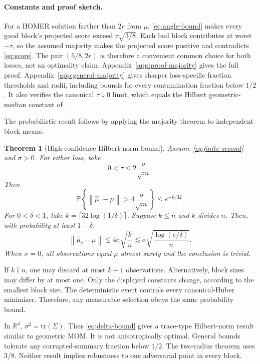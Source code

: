 \documentclass[twoside]{article}
\newtheorem{theorem}{Theorem}
\theoremstyle{definition}
\newcommand{\Pp}{\mathbb P}
\newcommand{\R}{\mathbb R}
\newcommand{\norm}[1]{\left\lVert #1\right\rVert}
\newcommand{\tr}{\mathrm{tr}}
\begin{document}
\paragraph{Constants and proof sketch.}
For a HOMER solution farther than $2r$ from $\mu$, \eqref{eq:angle-bound} makes every good block's projected score exceed $\tau\sqrt{3/8}$. Each bad block contributes at worst $-\tau$, so the assumed majority makes the projected score positive and contradicts \eqref{eq:score}. The pair $(5/8,2r)$ is therefore a convenient common choice for both losses, not an optimality claim. Appendix~\ref{app:proof-majority} gives the full proof. Appendix~\ref{app:general-majority} gives sharper loss-specific fraction thresholds and radii, including bounds for every contamination fraction below $1/2$. It also verifies the canonical $\tau\downarrow0$ limit, which equals the Hilbert geometric-median constant of \citet[Lemma~2.1]{minsker_2015_GeometricMedianRobust}.



The probabilistic result follows by applying the majority theorem to independent block means.

\begin{theorem}[High-confidence Hilbert-norm bound]\label{thm:high-prob}
Assume \eqref{eq:finite-second} and $\sigma>0$. For either loss, take
\[
    0<\tau\le 2\frac{\sigma}{\sqrt m}.
\]
Then
\begin{equation*}
    \Pp\left\{
    \norm{\hat\mu_\tau-\mu}>4\frac{\sigma}{\sqrt m}
    \right\}
    \le e^{-k/32}.
\end{equation*}
For $0<\delta<1$, take $k=\lceil32\log(1/\delta)\rceil$. Suppose $k\le n$ and $k$ divides $n$. Then, with probability at least $1-\delta$,
\begin{equation}\label{eq:delta-bound}
    \norm{\hat\mu_\tau-\mu}
    \le4\sigma\sqrt{\frac{k}{n}}
    \lesssim \sigma\sqrt{\frac{\log(e/\delta)}{n}}.
\end{equation}
When $\sigma=0$, all observations equal $\mu$ almost surely and the conclusion is trivial.
\end{theorem}
If $k\nmid n$, one may discard at most $k-1$ observations. Alternatively, block sizes may differ by at most one. Only the displayed constants change, according to the smallest block size. The deterministic event controls every canonical-Huber minimizer. Therefore, any measurable selection obeys the same probability bound.


In $\R^d$, $\sigma^2=\tr(\Sigma)$. Thus \eqref{eq:delta-bound} gives a trace-type Hilbert-norm result similar to geometric MOM. It is not anisotropically optimal. General bounds tolerate any corrupted-summary fraction below $1/2$. The two-radius theorem uses $3/8$. Neither result implies robustness to one adversarial point in every block.
\end{document}
